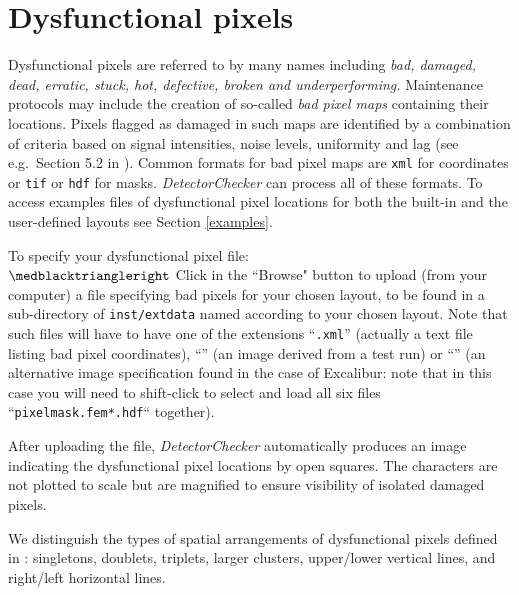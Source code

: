 \documentclass[11pt,a4paper]{article}
\newcommand{\DetectorChecker}{\emph{DetectorChecker}\xspace}
\begin{document}
\section{Dysfunctional pixels}\label{dysfct}

Dysfunctional pixels are referred to by many names including \emph{bad, damaged, dead, erratic, stuck, hot, defective, broken and underperforming.} Maintenance protocols may include the creation of so-called \emph{bad pixel maps} containing their locations. Pixels flagged as damaged in such maps are identified by a combination of criteria based on signal intensities, noise levels, uniformity and lag (see e.g.~Section 5.2 in \cite{manualXRD1621}). 
Common formats for bad pixel maps are \texttt{xml} for coordinates or \texttt{tif} or \texttt{hdf} for masks. 
\DetectorChecker can process all of these formats. To access examples files of dysfunctional pixel locations for both the built-in and the user-defined layouts see Section \ref{examples}.

To specify your dysfunctional pixel file:
\\
$\medblacktriangleright$ Click in the ``Browse" button 
to upload (from your computer) a file specifying bad pixels for your chosen layout, to be found in a sub-directory of \texttt{inst/extdata} named according to your chosen layout. Note that such files will have to have one of the extensions ``\texttt{.xml}'' (actually a text file listing bad pixel coordinates), ``'' (an image derived from a test run) or ``'' (an alternative image specification found in the case of Excalibur: note that in this case you will need to shift-click to select and load all six files ``\texttt{pixelmask.fem*.hdf}`` together).

After uploading the file, \DetectorChecker automatically produces an image indicating the dysfunctional pixel locations 
by open squares. The characters are not plotted to scale but are magnified to ensure visibility of isolated damaged pixels.

We distinguish the types of spatial arrangements of dysfunctional pixels defined in \cite{brettschneider2014crism}:
singletons, doublets, triplets, larger clusters, upper/lower vertical lines, and right/left horizontal lines.
\end{document}
